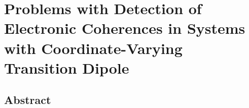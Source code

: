 \chapter{Problems with Detection of Electronic Coherences in Systems with Coordinate-Varying Transition Dipole}
\thispagestyle{plain}
\vspace{-.5cm}


\section*{Abstract}
    \dsp
    


